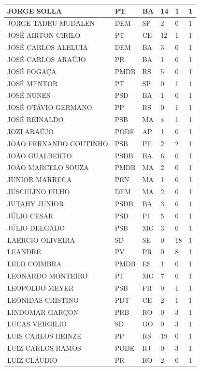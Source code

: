 \begin{apendicesenv}
\begin{longtable}{|L{4cm}|C{2cm}|C{1cm}|C{2cm}|C{1cm}|C{2cm}|}
JORGE SOLLA & PT & BA & 14 & 1 & 1 \\ \hline
JORGE TADEU MUDALEN & DEM & SP & 2 & 0 & 1 \\ \hline
JOSÉ AIRTON CIRILO & PT & CE & 12 & 1 & 1 \\ \hline
JOSÉ CARLOS ALELUIA & DEM & BA & 3 & 0 & 1 \\ \hline
JOSÉ CARLOS ARAÚJO & PR & BA & 1 & 0 & 1 \\ \hline
JOSÉ FOGAÇA & PMDB & RS & 5 & 0 & 1 \\ \hline
JOSÉ MENTOR & PT & SP & 0 & 1 & 1 \\ \hline
JOSÉ NUNES & PSD & BA & 1 & 0 & 1 \\ \hline
JOSÉ OTÁVIO GERMANO & PP & RS & 0 & 1 & 1 \\ \hline
JOSÉ REINALDO & PSB & MA & 4 & 1 & 1 \\ \hline
JOZI ARAÚJO & PODE & AP & 1 & 0 & 1 \\ \hline
JOÃO FERNANDO COUTINHO & PSB & PE & 2 & 2 & 1 \\ \hline
JOÃO GUALBERTO & PSDB & BA & 6 & 0 & 1 \\ \hline
JOÃO MARCELO SOUZA & PMDB & MA & 2 & 0 & 1 \\ \hline
JUNIOR MARRECA & PEN & MA & 1 & 0 & 1 \\ \hline
JUSCELINO FILHO & DEM & MA & 2 & 0 & 1 \\ \hline
JUTAHY JUNIOR & PSDB & BA & 3 & 0 & 1 \\ \hline
JÚLIO CESAR & PSD & PI & 5 & 0 & 1 \\ \hline
JÚLIO DELGADO & PSB & MG & 3 & 0 & 1 \\ \hline
LAERCIO OLIVEIRA & SD & SE & 0 & 18 & 1 \\ \hline
LEANDRE & PV & PR & 0 & 8 & 1 \\ \hline
LELO COIMBRA & PMDB & ES & 1 & 0 & 1 \\ \hline
LEONARDO MONTEIRO & PT & MG & 7 & 0 & 1 \\ \hline
LEOPOLDO MEYER & PSB & PR & 0 & 1 & 1 \\ \hline
LEÔNIDAS CRISTINO & PDT & CE & 2 & 1 & 1 \\ \hline
LINDOMAR GARÇON & PRB & RO & 0 & 3 & 1 \\ \hline
LUCAS VERGILIO & SD & GO & 0 & 3 & 1 \\ \hline
LUIS CARLOS HEINZE & PP & RS & 19 & 0 & 1 \\ \hline
LUIZ CARLOS RAMOS & PODE & RJ & 0 & 3 & 1 \\ \hline
LUIZ CLÁUDIO & PR & RO & 2 & 0 & 1 \\ \hline

\end{longtable}
\end{apendicesenv}
